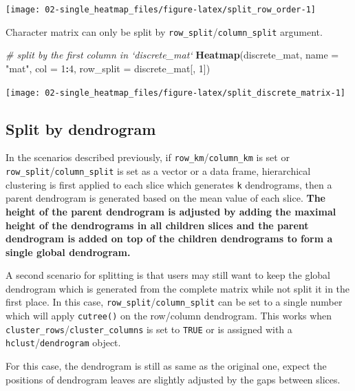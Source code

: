 \documentclass[]{book}
\newenvironment{Shaded}{\begin{snugshade}}{\end{snugshade}}
\newcommand{\KeywordTok}[1]{\textcolor[rgb]{0.13,0.29,0.53}{\textbf{#1}}}
\newcommand{\DataTypeTok}[1]{\textcolor[rgb]{0.13,0.29,0.53}{#1}}
\newcommand{\DecValTok}[1]{\textcolor[rgb]{0.00,0.00,0.81}{#1}}
\newcommand{\StringTok}[1]{\textcolor[rgb]{0.31,0.60,0.02}{#1}}
\newcommand{\CommentTok}[1]{\textcolor[rgb]{0.56,0.35,0.01}{\textit{#1}}}
\newcommand{\OperatorTok}[1]{\textcolor[rgb]{0.81,0.36,0.00}{\textbf{#1}}}
\newcommand{\NormalTok}[1]{#1}
\theoremstyle{definition}
\theoremstyle{definition}
\theoremstyle{definition}
\theoremstyle{remark}
\begin{document}
\begin{center}\texttt{[image: 02-single\_heatmap\_files/figure-latex/split\_row\_order-1]} \end{center}

Character matrix can only be split by
\texttt{row\_split}/\texttt{column\_split} argument.

\begin{Shaded}
\begin{Highlighting}[]
\CommentTok{# split by the first column in `discrete_mat`}
\KeywordTok{Heatmap}\NormalTok{(discrete_mat, }\DataTypeTok{name =} \StringTok{"mat"}\NormalTok{, }\DataTypeTok{col =} \DecValTok{1}\OperatorTok{:}\DecValTok{4}\NormalTok{, }\DataTypeTok{row_split =}\NormalTok{ discrete_mat[, }\DecValTok{1}\NormalTok{])}
\end{Highlighting}
\end{Shaded}

\begin{center}\texttt{[image: 02-single\_heatmap\_files/figure-latex/split\_discrete\_matrix-1]} \end{center}

\subsection{Split by dendrogram}\label{spilt-by-dendrogram}

In the scenarios described previously, if
\texttt{row\_km}/\texttt{column\_km} is set or
\texttt{row\_split}/\texttt{column\_split} is set as a vector or a data
frame, hierarchical clustering is first applied to each slice which
generates \texttt{k} dendrograms, then a parent dendrogram is generated
based on the mean value of each slice. \textbf{The height of the parent
dendrogram is adjusted by adding the maximal height of the dendrograms
in all children slices and the parent dendrogram is added on top of the
children dendrograms to form a single global dendrogram.}

A second scenario for splitting is that users may still want to keep the
global dendrogram which is generated from the complete matrix while not
split it in the first place. In this case,
\texttt{row\_split}/\texttt{column\_split} can be set to a single number
which will apply \texttt{cutree()} on the row/column dendrogram. This
works when \texttt{cluster\_rows}/\texttt{cluster\_columns} is set to
\texttt{TRUE} or is assigned with a \texttt{hclust}/\texttt{dendrogram}
object.

For this case, the dendrogram is still as same as the original one,
expect the positions of dendrogram leaves are slightly adjusted by the
gaps between slices.
\end{document}
